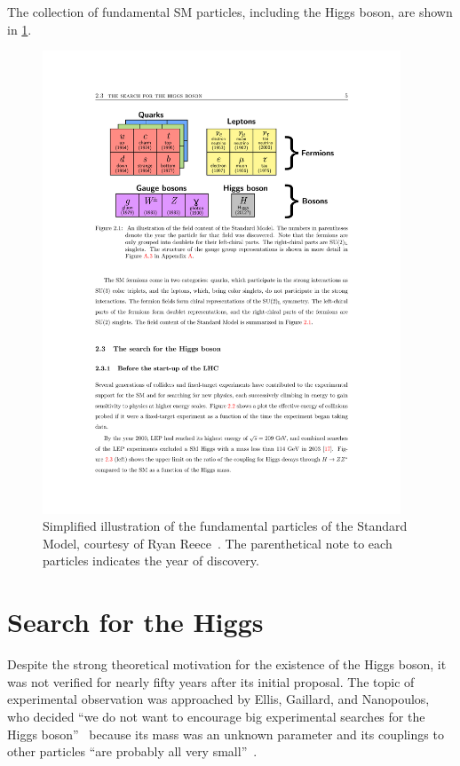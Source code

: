 The collection of fundamental SM particles, including the Higgs boson, are shown in \cref{fig:sm-particles}.

\begin{figure}[tp]
  \centering
  \includegraphics[width=0.95\textwidth]{figures/standardmodel/particles_reece.pdf}
  \caption{Simplified illustration of the fundamental particles of the Standard Model, courtesy of Ryan Reece~\cite{2013.thesis.ryan}. The parenthetical note to each particles indicates the year of discovery.}
  \label{fig:sm-particles}
\end{figure}

\section{Search for the Higgs}

Despite the strong theoretical motivation for the existence of the Higgs boson, it was not verified for nearly fifty years after its initial proposal. The topic of experimental observation was approached by Ellis, Gaillard, and Nanopoulos, who decided ``we do not want to encourage big experimental searches for the Higgs boson''~\cite{1976.higgspheno} because its mass was an unknown parameter and its couplings to other particles ``are probably all very small''~\cite{1976.higgspheno}.

